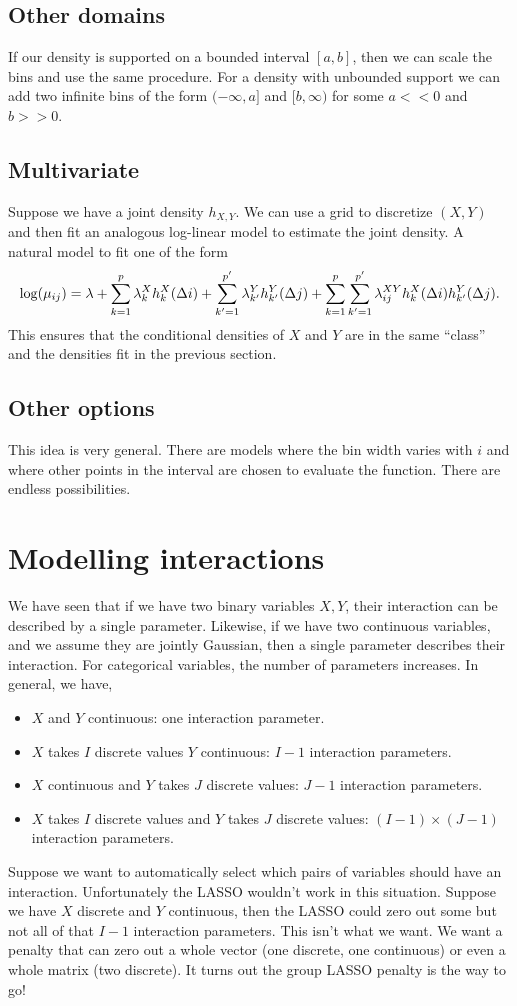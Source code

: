 \subsection{Other domains}
If our density is supported on a bounded interval $[a,b]$, then we can scale the bins and use the same procedure. For a density with unbounded support we can add two infinite bins of the form $(-\infty, a]$ and $[b,\infty)$ for some $a << 0$ and $b >> 0$. 
\subsection{Multivariate}
Suppose we have a joint density $h_{X,Y}$. We can use a grid to discretize $(X,Y)$ and then fit an analogous log-linear model to estimate the joint density. A natural model to fit one of the form
\[\log(\mu_{ij}) = \lambda + \sum_{k=1}^p \lambda^X_k h_k^X(\Delta i)+\sum_{k'=1}^{p'} \lambda^Y_{k'} h_{k'}^Y(\Delta j) + \sum_{k=1}^p \sum_{k'=1}^{p'} \lambda_{ij}^{XY}h_k^X(\Delta i)h_{k'}^Y(\Delta j). \]
This ensures that the conditional densities of $X$ and $Y$ are in the same ``class'' and the densities fit in the previous section. 
\subsection{Other options}
This idea is very general. There are models where the bin width varies with $i$ and where other points in the interval are chosen to evaluate the function. There are endless possibilities.
\section{Modelling interactions}
We have seen that if we have two binary variables $X,Y$, their interaction can be described by a single parameter. Likewise, if we have two continuous variables, and we assume they are jointly Gaussian, then a single parameter describes their interaction. For categorical variables, the number of parameters increases. In general, we have,
\begin{itemize}
    \item $X$ and $Y$ continuous: one interaction parameter.
    \item $X$ takes $I$ discrete values $Y$ continuous: $I-1$ interaction parameters.
    \item $X$ continuous and $Y$ takes $J$ discrete values: $J-1$ interaction parameters.
    \item $X$ takes $I$ discrete values and $Y$ takes $J$ discrete values: $(I-1)\times (J-1)$ interaction parameters.
\end{itemize}
Suppose we want to automatically select which pairs of variables should have an interaction. Unfortunately the LASSO wouldn't work in this situation. Suppose we have $X$ discrete and $Y$ continuous, then the LASSO could zero out some but not all of that $I-1$ interaction parameters. This isn't what we want. We want a penalty that can zero out a whole vector (one discrete, one continuous) or even a whole matrix (two discrete). It turns out the group LASSO penalty is the way to go!
